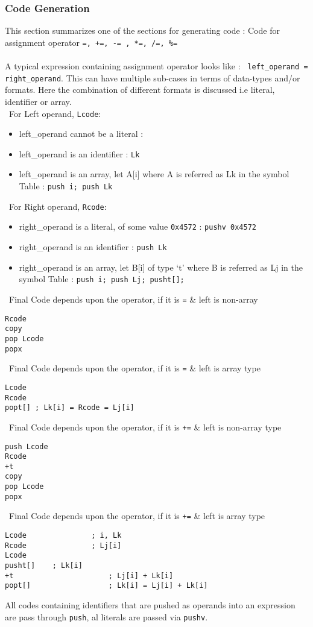 \documentclass[12pt]{article}
\begin{document}
\subsubsection{Code Generation}
This section summarizes one of the sections for generating code :
Code for assignment operator \texttt{=, +=, -= , *=,  /=, \%=} 
\\~
\\A typical  expression containing assignment operator looks like : \texttt{ left\_operand  = right\_operand}. This can have multiple sub-cases in terms of data-types and/or formats. Here the combination of different formats is discussed i.e literal, identifier or array. 
\\~For Left operand, \texttt{Lcode}:
\begin{itemize}
\item left\_operand cannot be a literal :
\item left\_operand is an identifier : \texttt{Lk}
\item left\_operand is an array, let  A[i] where A is referred as Lk in the symbol Table :  \texttt{push i; push Lk}
 \end{itemize}
 ~For Right operand,  \texttt{Rcode}:
\begin{itemize}
\item right\_operand is a literal, of some value \texttt{0x4572} : \texttt{pushv 0x4572}
\item right\_operand is an identifier :   \texttt{push Lk}
\item right\_operand  is an array, let B[i] of type `t' where B is referred as Lj in the symbol Table : \texttt{push i; push Lj; pusht[]; }
 \end{itemize}
~Final Code depends upon the operator, if it is \texttt{=} \& left is non-array
\begin{verbatim}
Rcode
copy
pop Lcode
popx
\end{verbatim}
~Final Code depends upon the operator, if it is \texttt{=} \& left is array type
\begin{verbatim}
Lcode
Rcode
popt[] ; Lk[i] = Rcode = Lj[i]
\end{verbatim}
~Final Code depends upon the operator, if it is \texttt{+=} \& left is non-array type
\begin{verbatim}
push Lcode
Rcode
+t
copy
pop Lcode
popx
\end{verbatim}
~Final Code depends upon the operator, if it is \texttt{+=} \& left is array type
\begin{verbatim}
Lcode  			 	; i, Lk
Rcode  			 	; Lj[i]
Lcode
pusht[]    ; Lk[i]
+t  			 	    ; Lj[i] + Lk[i]
popt[]  			 	; Lk[i] = Lj[i] + Lk[i]
\end{verbatim}

All codes containing identifiers that are pushed as operands into an expression are pass through \texttt{push}, al literals are passed via \texttt{pushv}. 
\end{document}
